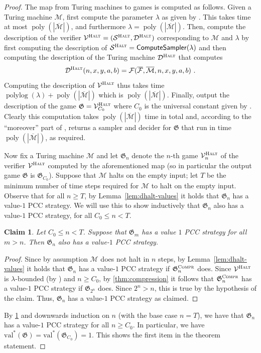 \documentclass[11pt]{article}
\newtheorem{claim}[theorem]{Claim}
\theoremstyle{definition}
\DeclareMathOperator{\poly}{poly}
\newcommand{\val}{\ensuremath{\mathrm{val}}}
\DeclareMathOperator{\polylog}{polylog}
\newcommand{\abs}[1]{\left\vert {#1} \right\vert}
\newcommand{\game}{\mathfrak{G}}
\newcommand{\sampler}{\mathcal{S}}
\newcommand{\decider}{\mathcal{D}}
\newcommand{\verifier}{\mathcal{V}}
\newcommand{\compr}{\textsc{Compr}}
\newcommand{\halt}{\textsc{Halt}}
\newcommand{\machine}{\cal{M}}
\renewcommand{\cal}[1]{\mathcal{#1}}
\newcommand{\tmstyle}[1]{\ensuremath{\mathsf{#1}}}
\newcommand{\ComputeSampler}{\tmstyle{ComputeSampler}}
\begin{document}
\begin{proof}
  The map from Turing machines to games is computed as follows. 
  Given a Turing machine $\machine$, first compute the parameter $\lambda$ as given by
  . This takes time at most $\poly(|\overline{\machine}|)$, and furthermore $\lambda = \poly(|\overline{\machine}|)$. 
  Then, compute the description of the verifier $\verifier^\halt = (\sampler^\halt,\decider^\halt)$ corresponding to $\machine$ and $\lambda$ 
  by first computing the description of $\sampler^\halt = \ComputeSampler(\lambda)$ and then computing the description of the Turing machine $\decider^\halt$ that computes
  \[
  	\decider^\halt(n,x,y,a,b) = \cal{F}(\overline{\cal{F}},\overline{\cal{M}},n,x,y,a,b)~.
  \]
  Computing the description of $\verifier^\halt$ thus takes time $\polylog(\lambda) + \poly(|\overline{\machine}|)$ which is $\poly(|\overline{\machine}|)$. Finally,
 	output the description of the game $\game = \verifier^\halt_{C_0}$ where $C_0$ is the universal constant given by . Clearly this computation takes $\poly(|\overline{\machine}|)$ time in total and, according to the ``moreover'' part of , returns a sampler and decider for $\game$ that run in time $\poly(\abs{\overline{\machine}})$, as required. 
  


	Now fix a Turing machine $\machine$ and let $\game_n$ denote the $n$-th game $\verifier^\halt_n$ of the verifier $\verifier^\halt$ computed by the aforementioned map (so in particular the output game $\game$ is $\game_{C_0}$). Suppose that $\machine$ halts on the empty input; let $T$ be the minimum number
  of time steps required for $\machine$ to halt on the empty input.
  Observe that for all $n \geq T$, by Lemma~\ref{lem:dhalt-values} it holds that
  $\game_n$ has a value-$1$ PCC strategy.
  We will use this to show inductively that $\game_n$ also has a value-$1$ PCC
  strategy, for all $ C_0 \leq n < T$.

  \begin{claim}
    Let $ C_0 \leq n < T$. Suppose that $\game_{m}$ has a value $1$ PCC
    strategy for all
    $m > n$. Then $\game_n$ also has a value-$1$ PCC strategy.
    \label{claim:induction-game}
  \end{claim}
  \begin{proof}
    Since by assumption $\cal{M}$ does not halt in $n$ steps, by
    Lemma~\ref{lem:dhalt-values} it holds that $\game_n$ has a value-$1$ PCC
    strategy if $\game^{\compr}_n$ does.
    Since $\verifier^\halt$ is $\lambda$-bounded (by ) and $n \geq C_0$, by
    \cref{thm:compression} it follows that $\game^{\compr}_n$ has a value-$1$ PCC
    strategy if $\game_{2^n}$ does.
    Since $2^n > n$, this is true by the hypothesis of the claim.
    Thus, $\game_n$ has a value-$1$ PCC strategy as claimed.
  \end{proof}
  By \cref{claim:induction-game} and downwards induction on $n$ (with the base
  case $n = T$), we have that $\game_n$ has a value-$1$ PCC strategy for all $n
  \geq C_0$.
  In particular, we have $\val^*(\game) = \val^*(\game_{C_0}) = 1$.
  This shows the first item in the theorem statement.


\end{proof}
\end{document}
